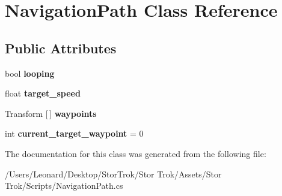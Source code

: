 \hypertarget{class_navigation_path}{}\section{Navigation\+Path Class Reference}
\label{class_navigation_path}
\subsection*{Public Attributes}
\begin{DoxyCompactItemize}
\item 
\mbox{\label{class_navigation_path_a41bd7f90ea533bd623047d68678670cf}} 
bool {\bfseries looping}
\item 
\mbox{\label{class_navigation_path_a25585b1b1e8d0e88fed5520f9af16211}} 
float {\bfseries target\+\_\+speed}
\item 
\mbox{\label{class_navigation_path_a657e5ffa623f45127b5358acba7a92a4}} 
Transform \mbox{[}$\,$\mbox{]} {\bfseries waypoints}
\item 
\mbox{\label{class_navigation_path_a296755ab47dac794e7cf1e49437bfa96}} 
int {\bfseries current\+\_\+target\+\_\+waypoint} = 0
\end{DoxyCompactItemize}


The documentation for this class was generated from the following file\+:\begin{DoxyCompactItemize}
\item 
/\+Users/\+Leonard/\+Desktop/\+Stor\+Trok/\+Stor Trok/\+Assets/\+Stor Trok/\+Scripts/Navigation\+Path.\+cs\end{DoxyCompactItemize}
